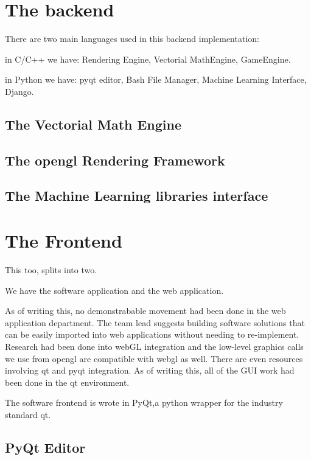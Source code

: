 \pagebreak



\part*{The backend}

  There are two main languages used in this backend implementation:

  \hline
  \hspace{10}

  in C/C++  we have: Rendering Engine, Vectorial MathEngine, GameEngine.

  in Python we have: pyqt editor, Bash File Manager, Machine Learning Interface, Django.

  \chapter*{The Vectorial Math Engine}
  

  \chapter*{The opengl Rendering Framework}
  

  \chapter*{The Machine Learning libraries interface}
  



\part*{The Frontend}

  This too, 
  splits into two.

  We have the software application and the web application.

  As of writing this, no demonstrabable movement had been done in the web application department. 
  The team lead suggests building software solutions that can be easily imported into web applications without needing to re-implement. Research had been done into webGL integration and the low-level graphics calls we use from opengl are compatible with webgl as well. 
  There are even resources involving qt and pyqt integration. As of writing this, all of the GUI work had been done in the qt environment.  


    The software frontend is wrote in PyQt,a python wrapper for the industry standard qt.

  \chapter*{PyQt Editor}
    





    \pagebreak

